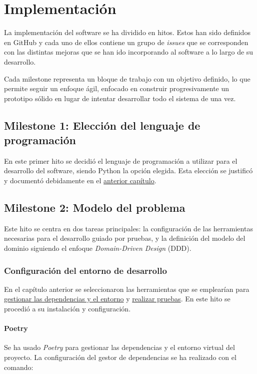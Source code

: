 \chapter{Implementación}

La implementación del software se ha dividido en hitos. Estos han sido definidos en GitHub
y cada uno de ellos contiene un grupo de \textit{issues} que se corresponden con las distintas
mejoras que se han ido incorporando al software a lo largo de su desarrollo.

Cada milestone representa un bloque de trabajo con un objetivo definido, lo que permite seguir
un enfoque ágil, enfocado en construir progresivamente un prototipo sólido en lugar de intentar
desarrollar todo el sistema de una vez. 

\section{Milestone 1: Elección del lenguaje de programación}
En este primer hito se decidió el lenguaje de programación a utilizar para el desarrollo del software,
siendo Python la opción elegida. Esta elección se justificó y documentó debidamente en el
\hyperref[sec:lenguaje-programación]{anterior capítulo}.

\section{Milestone 2: Modelo del problema}
Este hito se centra en dos tareas principales: la configuración de las herramientas necesarias para
el desarrollo guiado por pruebas, y la definición del modelo del dominio siguiendo el enfoque 
\textit{Domain-Driven Design} (DDD).

\subsection{Configuración del entorno de desarrollo}
En el capítulo anterior se seleccionaron las herramientas que se emplearían para 
\hyperref[sec:gestor-dependencias]{gestionar las dependencias y el entorno} y 
\hyperref[sec:herramienta-testeo]{realizar pruebas}. En este hito se procedió a su instalación y 
configuración.

\subsubsection{Poetry}
Se ha usado \textit{Poetry} para gestionar las dependencias y el entorno virtual del proyecto.
La configuración del gestor de dependencias se ha realizado con el comando:

